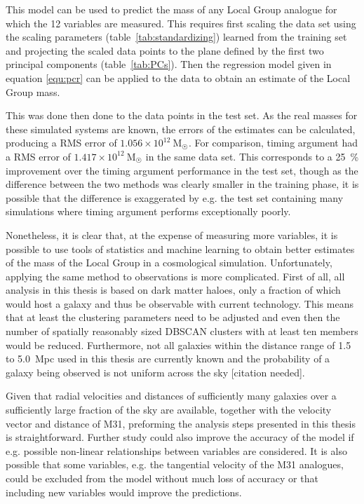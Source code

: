 \documentclass[english, oneside]{HYgradu}
\begin{document}
This model can be used to predict the mass of any Local Group analogue for which the 12 variables are measured. This requires first scaling the data set using the scaling parameters (table~\ref{tab:standardizing}) learned from the training set and projecting the scaled data points to the plane defined by the first two principal components (table~\ref{tab:PCs}). Then the regression model given in equation \ref{equ:pcr} can be applied to the data to obtain an estimate of the Local Group mass.

This was done then done to the data points in the test set. As the real masses for these simulated systems are known, the errors of the estimates can be calculated, producing a RMS error of $1.056 \times 10^{12}\ \mathrm{M}_{\astrosun}$. For comparison, timing argument had a RMS error of $1.417 \times 10^{12}\ \mathrm{M}_{\astrosun}$ in the same data set. %
This corresponds to a 25~\% improvement over the timing argument performance in the test set, though as the difference between the two methods was clearly smaller in the training phase, it is possible that the difference is exaggerated by e.g. the test set containing many simulations where timing argument performs exceptionally poorly.

Nonetheless, it is clear that, at the expense of measuring more variables, it is possible to use tools of statistics and machine learning to obtain better estimates of the mass of the Local Group in a cosmological simulation. Unfortunately, applying the same method to observations is more complicated. First of all, all analysis in this thesis is based on dark matter haloes, only a fraction of which would host a galaxy and thus be observable with current technology. This means that at least the clustering parameters need to be adjusted and even then the number of spatially reasonably sized DBSCAN clusters with at least ten members would be reduced. Furthermore, not all galaxies within the distance range of 1.5 to 5.0~Mpc used in this thesis are currently known and the probability of a galaxy being observed is not uniform across the sky [citation needed]. %

Given that radial velocities and distances of sufficiently many galaxies over a sufficiently large fraction of the sky are available, together with the velocity vector and distance of M31, preforming the analysis steps presented in this thesis is straightforward. Further study could also improve the accuracy of the model if e.g. possible non-linear relationships between variables are considered. It is also possible that some variables, e.g. the tangential velocity of the M31 analogues, could be excluded from the model without much loss of accuracy or that including new variables would improve the predictions.
\end{document}

